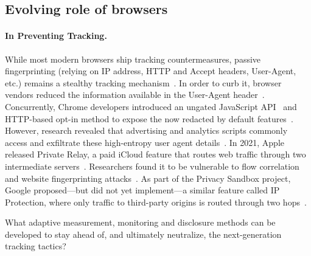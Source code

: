 \subsection{Evolving role of browsers}

\paragraph{In Preventing Tracking.}
While most modern browsers ship tracking countermeasures, passive fingerprinting (relying on IP address, HTTP and Accept headers, User-Agent, etc.) remains a stealthy tracking mechanism~\cite{mayerThirdPartyWebTracking2012,dotyMitigatingBrowserFingerprinting2019,fraihiClientsideServersideTracking2024}.
In order to curb it, browser vendors reduced the information available in the User-Agent header~\cite{davisReleaseNotesSafari2017,kimura1609304ReduceGeckos2020,googleWhatUserAgentReduction2024}.
%
Concurrently, Chrome developers introduced an ungated JavaScript API~\cite{mdnUserAgentClientHints2024,taylorUserAgentClientHints2024a} and HTTP-based opt-in method to expose the now redacted by default features~\cite{mdnHTTPClientHints2024}. However, research revealed that advertising and analytics scripts commonly access and exfiltrate these high-entropy user agent details~\cite{intumwayaseUARadarExploringImpact2023,senolUnveilingImpactUserAgent2023}.
In 2021, Apple released Private Relay, a paid iCloud feature that routes web traffic through two intermediate servers~\cite{appleICloudPrivateRelay2021}. Researchers found it to be vulnerable to flow correlation and website fingerprinting attacks~\cite{zohaibInvestigatingTrafficAnalysis2023}.
%
As part of the Privacy Sandbox project, Google proposed---but did not yet implement---a similar feature called IP Protection, where only traffic to third-party origins is routed through two hops~\cite{googleIPProtectionPrivacy2024}.


\begin{opbox}
What adaptive measurement, monitoring and disclosure methods can be developed to stay ahead of, and ultimately neutralize, the next-generation tracking tactics?
\end{opbox}


